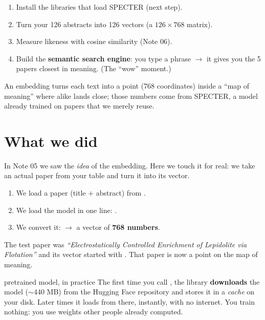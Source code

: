\documentclass[11pt,a4paper]{article}
\begin{document}
\begin{enumerate}
  \item Install the libraries that load SPECTER (next step).
  \item Turn your 126 abstracts into 126 vectors (a $126 \times 768$ matrix).
  \item Measure likeness with cosine similarity (Note 06).
  \item Build the \textbf{semantic search engine}: you type a phrase $\rightarrow$ it gives
        you the 5 papers closest in meaning. (The ``wow'' moment.)
\end{enumerate}

\begin{resumen}
An embedding turns each text into a point (768 coordinates) inside a ``map of meaning'' where
alike lands close; those numbers come from SPECTER, a model already trained on papers that we
merely reuse.
\end{resumen}
\clearpage
{}
{}

\section{What we did}

In Note 05 we saw the \emph{idea} of the embedding. Here we touch it for real: we take an
actual paper from your table and turn it into its vector.

\begin{enumerate}
  \item We load a paper (title $+$ abstract) from .
  \item We load the model in one line: .
  \item We convert it:  $\rightarrow$ a vector of \textbf{768 numbers}.
\end{enumerate}

The test paper was \emph{``Electrostatically Controlled Enrichment of Lepidolite via
Flotation''} and its vector started with \codigo{[-0.59, -0.16, 1.34, ...]}. That paper is
now a point on the map of meaning.

\begin{concepto}{pretrained model, in practice}
The first time you call , the library
\textbf{downloads} the model ($\sim$440 MB) from the Hugging Face repository and stores it in
a \emph{cache} on your disk. Later times it loads from there, instantly, with no internet.
You train nothing: you use weights other people already computed.
\end{concepto}
\end{document}
